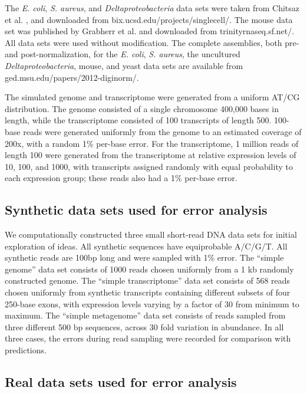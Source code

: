 The {\em E. coli}, {\em S. aureus}, and {\em Deltaproteobacteria} data sets
were taken from Chitsaz et al. \cite{pubmed21926975}, and downloaded from
bix.ucsd.edu/projects/singlecell/.  The mouse data set was published by
Grabherr et al. \cite{pubmed21572440} and downloaded from
trinityrnaseq.sf.net/.  All data sets were used without modification. The
complete assemblies, both pre- and post-normalization, for the {\em E. coli},
{\em S. aureus}, the uncultured {\em Deltaproteobacteria}, mouse, and yeast
data sets are available from ged.msu.edu/papers/2012-diginorm/.

The simulated genome and transcriptome were generated from a uniform AT/CG
distribution.  The genome consisted of a single chromosome 400,000 bases in
length, while the transcriptome consisted of 100 transcripts of length 500.
100-base reads were generated uniformly from the genome to an estimated
coverage of 200x, with a random 1\% per-base error.  For the transcriptome, 1
million reads of length 100 were generated from the transcriptome at relative
expression levels of 10, 100, and 1000, with transcripts assigned randomly with
equal probability to each expression group; these reads also had a 1\% per-base
error.


\subsection{Synthetic data sets used for error analysis}

We computationally constructed three small short-read DNA data sets for initial
exploration of ideas.  All synthetic sequences have equiprobable A/C/G/T.  All
synthetic reads are 100bp long and were sampled with 1\% error.  The ``simple
genome'' data set consists of 1000 reads chosen uniformly from a 1 kb randomly
constructed genome. The ``simple transcriptome'' data set consists of 568 reads
chosen uniformly from synthetic transcripts containing different subsets of
four 250-base exons, with expression levels varying by a factor of 30 from
minimum to maximum.  The ``simple metagenome'' data set consists of reads
sampled from three different 500 bp sequences, across 30 fold variation in
abundance.  In all three cases, the errors during read sampling were recorded
for comparison with predictions.

\subsection{Real data sets used for error analysis}


